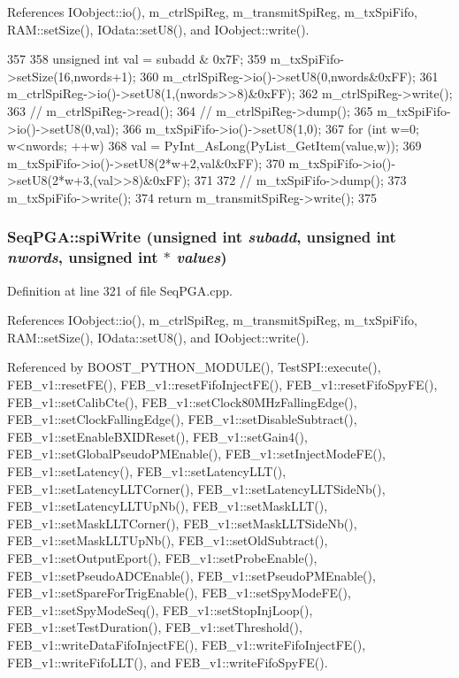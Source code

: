 References IOobject::io(), m\_\-ctrlSpiReg, m\_\-transmitSpiReg, m\_\-txSpiFifo, RAM::setSize(), IOdata::setU8(), and IOobject::write().


\begin{DoxyCode}
357                                                                                  
         {
358   unsigned int val = subadd & 0x7F; 
359   m_txSpiFifo->setSize(16,nwords+1);
360   m_ctrlSpiReg->io()->setU8(0,nwords&0xFF);
361   m_ctrlSpiReg->io()->setU8(1,(nwords>>8)&0xFF);
362   m_ctrlSpiReg->write();
363   //  m_ctrlSpiReg->read();
364   //  m_ctrlSpiReg->dump();
365   m_txSpiFifo->io()->setU8(0,val);
366   m_txSpiFifo->io()->setU8(1,0);
367   for (int w=0; w<nwords; ++w) {
368     val = PyInt_AsLong(PyList_GetItem(value,w));
369     m_txSpiFifo->io()->setU8(2*w+2,val&0xFF);
370     m_txSpiFifo->io()->setU8(2*w+3,(val>>8)&0xFF);
371   }
372   //  m_txSpiFifo->dump();
373   m_txSpiFifo->write();
374   return m_transmitSpiReg->write();
375 }
\end{DoxyCode}
\hypertarget{classSeqPGA_ad4421841ce4ce8b88ad13f63216f0743}{
\subsubsection[{spiWrite}]{ SeqPGA::spiWrite (unsigned int {\em subadd}, \/  unsigned int {\em nwords}, \/  unsigned int $\ast$ {\em values})}}
\label{classSeqPGA_ad4421841ce4ce8b88ad13f63216f0743}


Definition at line 321 of file SeqPGA.cpp.

References IOobject::io(), m\_\-ctrlSpiReg, m\_\-transmitSpiReg, m\_\-txSpiFifo, RAM::setSize(), IOdata::setU8(), and IOobject::write().

Referenced by BOOST\_\-PYTHON\_\-MODULE(), TestSPI::execute(), FEB\_\-v1::resetFE(), FEB\_\-v1::resetFifoInjectFE(), FEB\_\-v1::resetFifoSpyFE(), FEB\_\-v1::setCalibCte(), FEB\_\-v1::setClock80MHzFallingEdge(), FEB\_\-v1::setClockFallingEdge(), FEB\_\-v1::setDisableSubtract(), FEB\_\-v1::setEnableBXIDReset(), FEB\_\-v1::setGain4(), FEB\_\-v1::setGlobalPseudoPMEnable(), FEB\_\-v1::setInjectModeFE(), FEB\_\-v1::setLatency(), FEB\_\-v1::setLatencyLLT(), FEB\_\-v1::setLatencyLLTCorner(), FEB\_\-v1::setLatencyLLTSideNb(), FEB\_\-v1::setLatencyLLTUpNb(), FEB\_\-v1::setMaskLLT(), FEB\_\-v1::setMaskLLTCorner(), FEB\_\-v1::setMaskLLTSideNb(), FEB\_\-v1::setMaskLLTUpNb(), FEB\_\-v1::setOldSubtract(), FEB\_\-v1::setOutputEport(), FEB\_\-v1::setProbeEnable(), FEB\_\-v1::setPseudoADCEnable(), FEB\_\-v1::setPseudoPMEnable(), FEB\_\-v1::setSpareForTrigEnable(), FEB\_\-v1::setSpyModeFE(), FEB\_\-v1::setSpyModeSeq(), FEB\_\-v1::setStopInjLoop(), FEB\_\-v1::setTestDuration(), FEB\_\-v1::setThreshold(), FEB\_\-v1::writeDataFifoInjectFE(), FEB\_\-v1::writeFifoInjectFE(), FEB\_\-v1::writeFifoLLT(), and FEB\_\-v1::writeFifoSpyFE().


